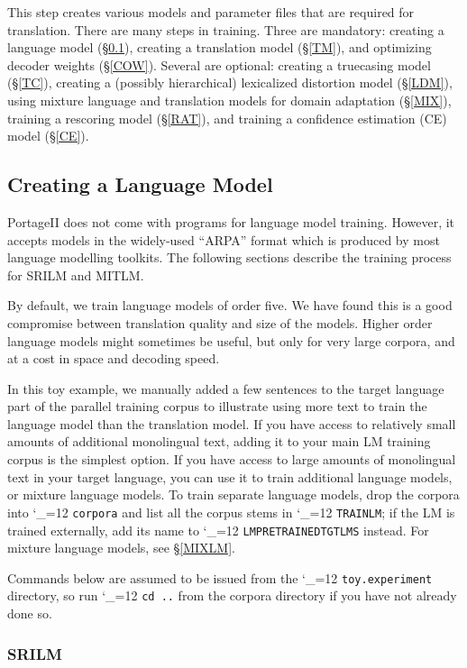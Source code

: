 \documentclass[11pt,letterpaper]{article}
\newcommand{\PS}{PortageII\xspace}
\def\code{\begingroup\catcode`\_=12 \codex}
\newcommand{\codex}[1]{\texttt{#1}\endgroup}
\begin{document}
This step creates various models and parameter files that are required for
translation. There are many steps in training.  Three are mandatory: creating a
language model (\S\ref{LM}), creating a translation model (\S\ref{TM}), and
optimizing decoder weights (\S\ref{COW}).  Several are optional: creating a
truecasing model (\S\ref{TC}), creating a (possibly hierarchical) lexicalized
distortion model (\S\ref{LDM}), using mixture language and translation models
for domain adaptation (\S\ref{MIX}), training a rescoring model (\S\ref{RAT}),
and training a confidence estimation (CE) model (\S\ref{CE}).

\subsection{Creating a Language Model} \label{LM}

\PS does not come with programs for language model training. However, it
accepts models in the widely-used ``ARPA'' format which is produced by most
language modelling toolkits.  The following sections describe the training
process for SRILM and MITLM.

By default, we train language models of order five.  We have found this is a
good compromise between translation quality and size of the models.  Higher
order language models might sometimes be useful, but only for very large
corpora, and at a cost in space and decoding speed.

In this toy example, we manually added a few sentences to the target language
part of the parallel training corpus to illustrate using more text to train the
language model than the translation model.  If you have access to relatively
small amounts of additional monolingual text, adding it to your main LM
training corpus is the simplest option.  If you have access to large amounts of
monolingual text in your target language, you can use it to train additional
language models, or mixture language models.  To train separate language
models, drop the corpora into \code{corpora} and list all the corpus stems in
\code{TRAIN\us{}LM}; if the LM is trained externally, add its name to
\code{LM\us{}PRETRAINED\us{}TGT\us{}LMS} instead.  For mixture language models,
see \S\ref{MIXLM}.

Commands below are assumed to be issued from the \code{toy.experiment}
directory, so run \code{cd ..} from the corpora directory if you have not
already done so.

\subsubsection{SRILM}
\end{document}
